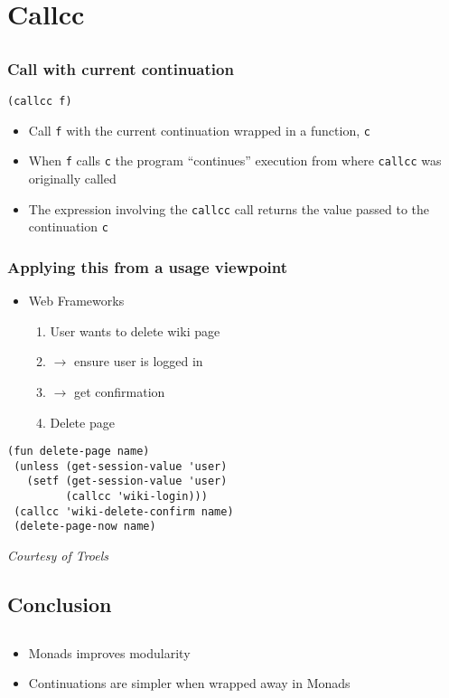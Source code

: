 \documentclass{beamer}
\begin{document}
\section{Callcc}
\subsection{} 
\begin{frame}[fragile]
\frametitle{Call with current continuation}

\begin{lstlisting}
(callcc f)
\end{lstlisting}

\begin{itemize}
\item Call \texttt{f} with the current continuation wrapped in a
  function, \texttt{c}
\item When \texttt{f} calls \texttt{c} the program ``continues''
  execution from where \texttt{callcc} was originally called
\item The expression involving the \texttt{callcc} call returns the
  value passed to the continuation \texttt{c}
\end{itemize}
\end{frame}

\begin{frame}[fragile]
\frametitle{Applying this from a usage viewpoint}
\begin{itemize}
\item Web Frameworks
  \begin{enumerate}
  \item User wants to delete wiki page
  \item $\rightarrow$ ensure user is logged in 
  \item $\rightarrow$ get confirmation
  \item Delete page
  \end{enumerate}
\end{itemize}

\lstset{basicstyle=\footnotesize\ttfamily}
\begin{lstlisting}
(fun delete-page name)
 (unless (get-session-value 'user)
   (setf (get-session-value 'user) 
         (callcc 'wiki-login)))
 (callcc 'wiki-delete-confirm name)
 (delete-page-now name)
\end{lstlisting}
\small
\emph{Courtesy of Troels}

\end{frame}


\begin{frame}[fragile]
\section{Conclusion}
\subsection{}
\begin{itemize}
\item Monads improves modularity
\item Continuations are simpler when wrapped away in Monads
\end{itemize}
\end{frame}
\end{document}
